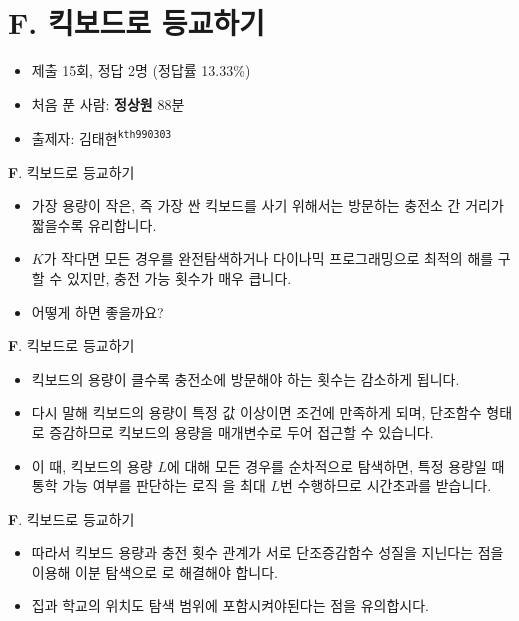 \section{F. 킥보드로 등교하기}

\begin{frame} %
    \begin{itemize}
    	\item 제출 15회, 정답 2명 (정답률 13.33\%)
    	\item 처음 푼 사람: \textbf{정상원} 88분
        \item 출제자: 김태현\textsuperscript{\color{kupc-gray}\texttt{kth990303}}
    \end{itemize}
\end{frame}

\begin{frame}{\textbf{F}. 킥보드로 등교하기}
    \begin{itemize}
        \item 가장 용량이 작은, 즉 가장 싼 킥보드를 사기 위해서는 방문하는 충전소 간 거리가 짧을수록 유리합니다. 
        \item $K$가 작다면 모든 경우를 완전탐색하거나 다이나믹 프로그래밍으로 최적의 해를 구할 수 있지만, 충전 가능 횟수가 매우 큽니다.
        \item 어떻게 하면 좋을까요?
    \end{itemize}
\end{frame}

\begin{frame}{\textbf{F}. 킥보드로 등교하기}
    \begin{itemize}
        \item 킥보드의 용량이 클수록 충전소에 방문해야 하는 횟수는 감소하게 됩니다. 
        \item 다시 말해 킥보드의 용량이 특정 값 이상이면 조건에 만족하게 되며, 단조함수 형태로 증감하므로 킥보드의 용량을 매개변수로 두어 접근할 수 있습니다.
        \item 이 때, 킥보드의 용량 $L$에 대해 모든 경우를 순차적으로 탐색하면, 특정 용량일 때 통학 가능 여부를 판단하는 로직 을 최대 $L$번 수행하므로 시간초과를 받습니다.
    \end{itemize}
\end{frame}

\begin{frame}{\textbf{F}. 킥보드로 등교하기}
    \begin{itemize}
        \item 따라서 킥보드 용량과 충전 횟수 관계가 서로 단조증감함수 성질을 지닌다는 점을 이용해 이분 탐색으로 로 해결해야 합니다.
        \item 집과 학교의 위치도 탐색 범위에 포함시켜야된다는 점을 유의합시다.
    \end{itemize}
\end{frame}